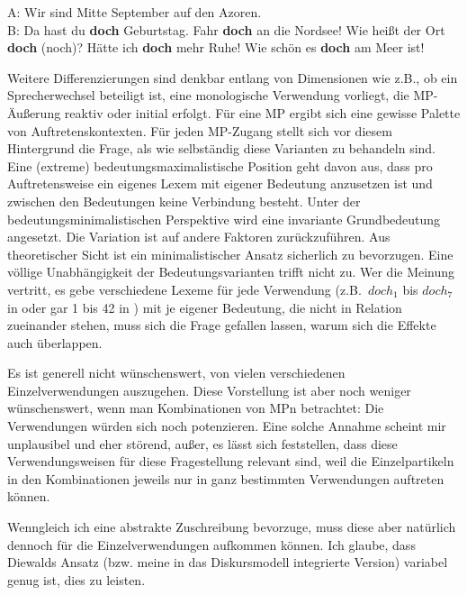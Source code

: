 \begin{exe}
	\ex\label{253} 
		\begin{xlist}	
			\ex\label{253a} A: Wir sind Mitte September auf den Azoren.\\
							B: Da hast du \textbf{doch} Geburtstag.
			\ex\label{253b} Fahr \textbf{doch} an die Nordsee!
			\ex\label{153c} Wie heißt der Ort \textbf{doch} (noch)?
			\ex\label{253d} Hätte ich \textbf{doch} mehr Ruhe!
			\ex\label{153e} Wie schön es \textbf{doch} am Meer ist!
		\end{xlist}
\end{exe}
Weitere Differenzierungen sind denkbar entlang von Dimensionen wie z.B., ob ein Sprecherwechsel beteiligt ist, eine monologische Verwendung vorliegt, die MP-Äußerung reaktiv oder initial erfolgt. Für eine MP ergibt sich eine gewisse Palette von Auftretenskontexten. Für jeden MP-Zugang stellt sich vor diesem Hintergrund die Frage, als wie selbständig diese Varianten zu behandeln sind. Eine (extreme) bedeutungsmaximalistische Position geht davon aus, dass pro Auftretensweise ein eigenes Lexem mit eigener Bedeutung anzusetzen ist und zwischen den Bedeutungen keine Verbindung besteht. Unter der bedeutungsminimalistischen Perspektive  wird eine invariante Grundbedeutung angesetzt. Die Variation ist auf andere Faktoren zurückzuführen. Aus theoretischer Sicht ist ein minimalistischer Ansatz sicherlich zu bevorzugen. Eine völlige Unabhängigkeit der Bedeutungsvarianten trifft nicht zu. Wer die Meinung vertritt, es gebe verschiedene Lexeme für jede Verwendung (z.B.\ $doch_{1}$ bis $doch_{7}$ in \citealt[33--34]{Helbig1981} oder gar 1 bis 42 in \citealt{Volmert1991}) mit je eigener Bedeutung, die nicht in Relation zueinander stehen, muss sich die Frage gefallen lassen, warum sich die Effekte auch überlappen.\largerpage 

Es ist generell nicht wünschenswert, von vielen verschiedenen Einzelverwendungen auszugehen. Diese Vorstellung ist aber noch weniger wünschenswert, wenn man Kombinationen von MPn betrachtet: Die Verwendungen würden sich noch potenzieren. Eine solche Annahme scheint mir unplausibel und eher störend, außer, es lässt sich feststellen, dass diese Verwendungsweisen für diese Fragestellung relevant sind, weil die Einzelpartikeln in den Kombinationen jeweils nur in ganz bestimmten Verwendungen auftreten können.

Wenngleich ich eine abstrakte Zuschreibung bevorzuge, muss diese aber natürlich dennoch für die Einzelverwendungen aufkommen können. Ich glaube, dass Diewalds Ansatz (bzw. meine in das Diskursmodell integrierte Version) variabel genug ist, dies zu leisten. 

